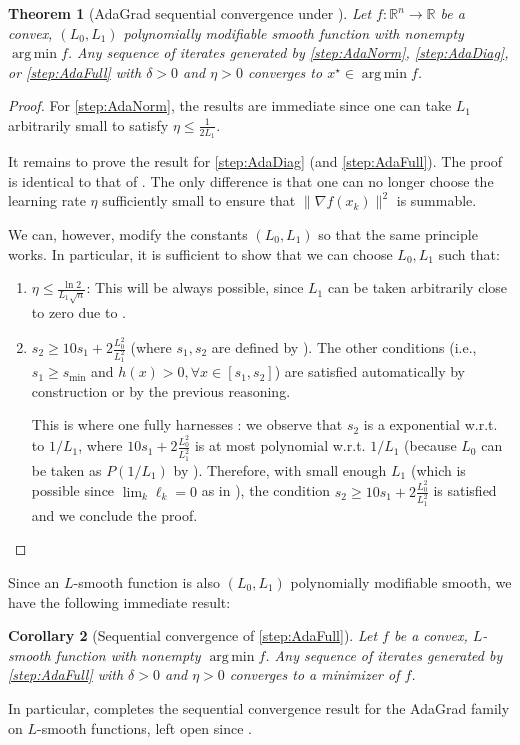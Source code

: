 \documentclass{article}
\theoremstyle{plain}
\newtheorem{theorem}{Theorem}
\newtheorem{corollary}[theorem]{Corollary}
\theoremstyle{definition}
\theoremstyle{remark}
\newcommand{\argmin}{\operatorname{arg\,min}}
\newcommand*{\RR}{\mathbb{R}}
\begin{document}
\begin{theorem}[AdaGrad sequential convergence under ]
    \label{theorem:adagrad-l0-l1-modifiable-convergence}
    Let $f: \RR^n \to \RR$ be a convex, $(L_0,L_1)$ polynomially modifiable smooth function with nonempty $\argmin f$. Any sequence of iterates generated by \ref{step:AdaNorm}, \ref{step:AdaDiag}, or \ref{step:AdaFull} with $\delta >0$ and $\eta > 0$ converges to $x^\star \in \argmin f$.
\end{theorem}
\begin{proof}
    For \ref{step:AdaNorm}, the results are immediate since one can take $L_1$ arbitrarily small to satisfy $\eta \leq \frac{1}{2L_1}$.
    
    It remains to prove the result for \ref{step:AdaDiag} (and \ref{step:AdaFull}). The proof is identical to that of . The only difference is that one can no longer choose the learning rate $\eta$ sufficiently small to ensure that $\|\nabla f(x_k)\|^2$ is summable. 

    We can, however, modify the constants $(L_0, L_1)$ so that the same principle works. In particular, it is sufficient to show that we can choose $L_0, L_1$ such that: 
    \begin{enumerate}[leftmargin=*]
        \item $\eta \leq \frac{\ln 2}{L_1\sqrt{n}}$: This will be always possible, since $L_1$ can be taken arbitrarily close to zero due to .
        \item $s_2 \geq 10 s_1 + 2\frac{L_0^2}{L_1^2}$ (where $s_1, s_2$ are defined by ). The other conditions (i.e., $s_1 \geq s_{\min}$ and $h(x) > 0, \forall x \in [s_1,s_2]$) are satisfied automatically by construction or by the previous reasoning. 
        
        This is where one fully harnesses : we observe that $s_2$ is a exponential w.r.t. to $1 / L_1$, where $10s_1 + 2\frac{L_0^2}{L_1^2}$ is at most polynomial w.r.t. $1/L_1$ (because $L_0$ can be taken as $P(1/L_1)$ by ). Therefore, with small enough $L_1$ (which is possible since $\lim_k \ell_k = 0$ as in ), the condition $s_2 \geq 10 s_1 + 2\frac{L_0^2}{L_1^2}$ is satisfied and we conclude the proof.  
    \end{enumerate}
\end{proof}
Since an $L$-smooth function is also $(L_0,L_1)$ polynomially modifiable smooth, we have the following immediate result:
\begin{corollary}[Sequential convergence of \ref{step:AdaFull}]
    \label{cor:adafull-L-smooth}
    Let $f$ be a convex, $L$-smooth function with nonempty $\argmin f$. Any sequence of iterates generated by \ref{step:AdaFull} with $\delta > 0$ and $\eta > 0$ converges to a minimizer of $f$. 
\end{corollary}
In particular,  completes the sequential convergence result for the AdaGrad family on $L$-smooth functions, left open since \citet{traore2021sequential}.
\end{document}
